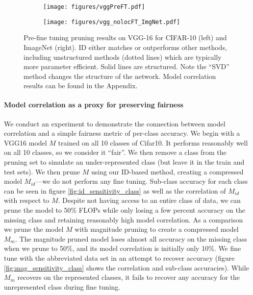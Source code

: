 \begin{figure}[h!]
\centering
\begin{subfigure}{.49\textwidth}
  \texttt{[image: figures/vggPreFT.pdf]} %
  \label{fig:vggpreft}
\end{subfigure}
\begin{subfigure}{.49\textwidth}
  \texttt{[image: figures/vgg\_nolocFT\_ImgNet.pdf]} %
  \label{fig:metrics}
\end{subfigure}%
    \caption{
    Pre-fine tuning pruning results on VGG-16 for CIFAR-10 (left) and ImageNet (right).
    ID either matches or outperforms other methods, including unstructured methods (dotted lines) which are typically more parameter efficient.
    Solid lines are structured.
    Note the ``SVD'' method 
    changes the structure of the network. 
    Model correlation results can be found in the Appendix.}
\label{fig:vgg16preft}
\end{figure}

\paragraph{Model correlation as a proxy for preserving fairness}

We conduct an experiment to demonstrate the connection between model correlation and a simple fairness metric of per-class accuracy.  We begin with a VGG16 model $M$ trained on all 10 classes of Cifar10.  It performs reasonably well on all 10 classes, so we consider it ``fair''.  We then remove a class from the pruning set to simulate an under-represented class (but leave it in the train and test sets). We then prune $M$ using our ID-based method, creating a compressed model $M_{id}$---we do not perform any fine tuning. Sub-class accuracy for each class can be seen in figure \ref{fig:id_sensitivity_class} as well as the correlation of $M_{id}$ with respect to $M$. Despite not having access to an entire class of data, we can prune the model to 50\% FLOPs while only losing a few percent accuracy on the missing class and retaining reasonably high model correlation. As a comparison we prune the model $M$ with magnitude pruning to create a compressed model $M_m$. The magnitude pruned model loses almost all accuracy on the missing class when we prune to 50\%, and its model correlation is initially only 10\%. We fine tune with the abbreviated data set in an attempt to recover accuracy (figure \ref{fig:mag_sensitivity_class} shows the correlation and sub-class accuracies). While $M_m$ recovers on the represented classes, it fails to recover any accuracy for the unrepresented class during fine tuning.  
 

